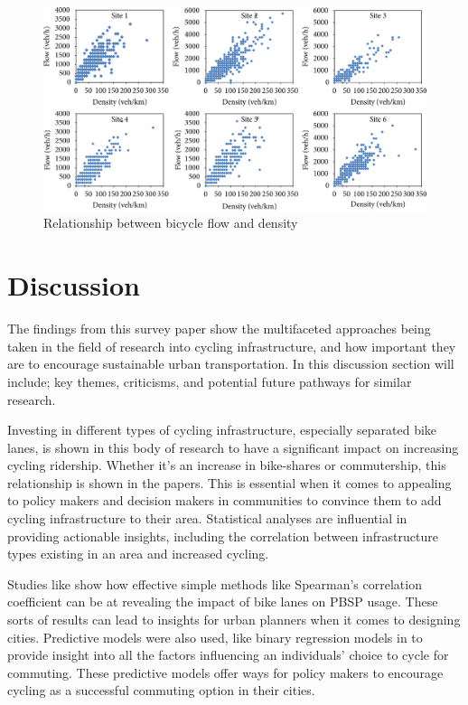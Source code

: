 \documentclass[12pt, letterpaper]{article}
\begin{document}
\begin{figure}[hbt!]
    \centering \includegraphics[width=1\textwidth]{flowdensity.png}
    \caption{Relationship between bicycle flow and density}
    \label{fig:flow}
\end{figure}


\section{Discussion}
\label{sec:disc}

The findings from this survey paper show the multifaceted approaches being taken in the field of research into cycling infrastructure, and how important they are to encourage sustainable urban transportation. In this discussion section will include; key themes, criticisms, and potential future pathways for similar research. \par

Investing in different types of cycling infrastructure, especially separated bike lanes, is shown in this body of research to have a significant impact on increasing cycling ridership. Whether it's an increase in bike-shares or commutership, this relationship is shown in the papers. This is essential when it comes to appealing to policy makers and decision makers in communities to convince them to add cycling infrastructure to their area. Statistical analyses are influential in providing actionable insights, including the correlation between infrastructure types existing in an area and increased cycling. \par

Studies like \citet{1MateoBabiano2016} show how effective simple methods like Spearman's correlation coefficient can be at revealing the impact of bike lanes on PBSP usage. These sorts of results can lead to insights for urban planners when it comes to designing cities. Predictive models were also used, like binary regression models in \citet{2Yujun2019} to provide insight into all the factors influencing an individuals' choice to cycle for commuting. These predictive models offer ways for policy makers to encourage cycling as a successful commuting option in their cities.\par
\end{document}

